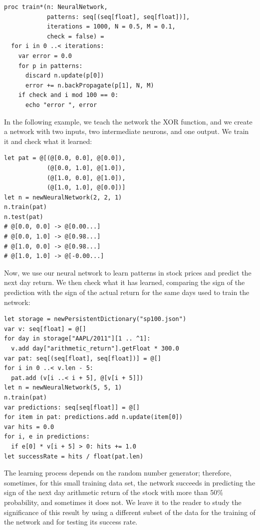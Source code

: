 \documentclass[justified, sixbynine]{tufte-book}
\def\ft{\small\tt}
\theoremstyle{plain}%
\newtheorem * {corollary}{Corollary}
\theoremstyle{definition}
\theoremstyle{remark}
\newtheorem * {remark}{Remark}
\newtheorem * {note}{Note}
\begin{document}
\begin{fullwidth}
\begin{lstlisting}[caption={in file: {\ft nlib/neural.nim}}]
proc train*(n: NeuralNetwork,
            patterns: seq[(seq[float], seq[float])],
            iterations = 1000, N = 0.5, M = 0.1,
            check = false) =
  for i in 0 ..< iterations:
    var error = 0.0
    for p in patterns:
      discard n.update(p[0])
      error += n.backPropagate(p[1], N, M)
    if check and i mod 100 == 0:
      echo "error ", error
\end{lstlisting}

In the following example, we teach the network the XOR function, and we create a network with two inputs, two intermediate neurons, and one output. We train it and check what it learned:

\begin{lstlisting}
let pat = @[(@[0.0, 0.0], @[0.0]),
            (@[0.0, 1.0], @[1.0]),
            (@[1.0, 0.0], @[1.0]),
            (@[1.0, 1.0], @[0.0])]
let n = newNeuralNetwork(2, 2, 1)
n.train(pat)
n.test(pat)
# @[0.0, 0.0] -> @[0.00...]
# @[0.0, 1.0] -> @[0.98...]
# @[1.0, 0.0] -> @[0.98...]
# @[1.0, 1.0] -> @[-0.00...]
\end{lstlisting}

Now, we use our neural network to learn patterns in stock prices and predict the next day return. We then check what it has learned, comparing the sign of the prediction with the sign of the actual return for the same days used to train the network:
\begin{lstlisting}[caption={in file: {\ft test.nim}}]
let storage = newPersistentDictionary("sp100.json")
var v: seq[float] = @[]
for day in storage["AAPL/2011"][1 .. ^1]:
  v.add day["arithmetic_return"].getFloat * 300.0
var pat: seq[(seq[float], seq[float])] = @[]
for i in 0 ..< v.len - 5:
  pat.add (v[i ..< i + 5], @[v[i + 5]])
let n = newNeuralNetwork(5, 5, 1)
n.train(pat)
var predictions: seq[seq[float]] = @[]
for item in pat: predictions.add n.update(item[0])
var hits = 0.0
for i, e in predictions:
  if e[0] * v[i + 5] > 0: hits += 1.0
let successRate = hits / float(pat.len)
\end{lstlisting}
The learning process depends on the random number generator; therefore, sometimes, for this small training data set, the network succeeds in predicting the sign of the next day arithmetic return of the stock with more than 50\% probability, and sometimes it does not. We leave it to the reader to study the significance of this result by using a different subset of the data for the training of the network and for testing its success rate.


\end{fullwidth}
\end{document}
